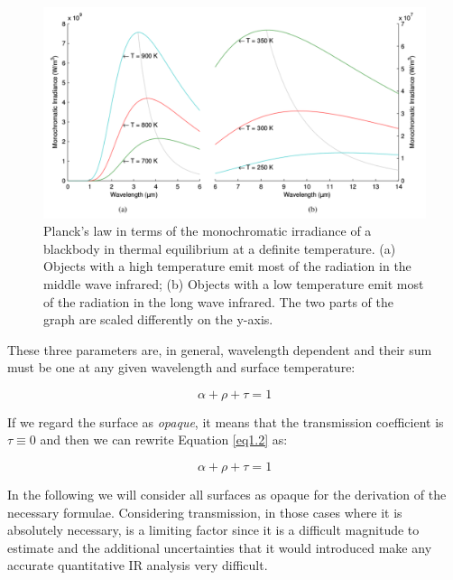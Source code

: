 		\begin{figure}[ht!]
			\centering
			\captionsetup{justification=centering,margin=2cm}
			\includegraphics[scale=0.35]{Figures/Chapter01/PlankFunction.pdf}
			\caption{Planck’s law in terms of the  monochromatic irradiance of  a blackbody in thermal equilibrium at a definite temperature. (a) Objects with a high temperature emit most of the radiation in the middle wave infrared; (b) Objects with a low temperature emit most of the radiation in the long wave infrared. The two parts of the graph are scaled differently on the y-axis.}\label{fig1.3}
		\end{figure}		
		
		These three parameters are, in general, wavelength dependent and their sum must be one at any given wavelength and surface temperature:
		
		\begin{equation}\label{eq1.2}
			\alpha + \rho + \tau = 1
		\end{equation}\bigskip
		
		If we regard the surface as \textit{opaque}, it means that the transmission coefficient is $\tau \equiv 0$ and then we can rewrite Equation \ref{eq1.2} as:	
		
		\begin{equation}\label{eq1.3}
			\alpha + \rho + \tau = 1
		\end{equation}\bigskip
		
		In the following we will consider all surfaces as opaque for the derivation of the necessary formulae. Considering transmission, in those cases where it is absolutely necessary, is a limiting factor since it is a difficult magnitude to estimate and the additional uncertainties that it would introduced make any accurate quantitative IR analysis very difficult.
		\bigskip
		

